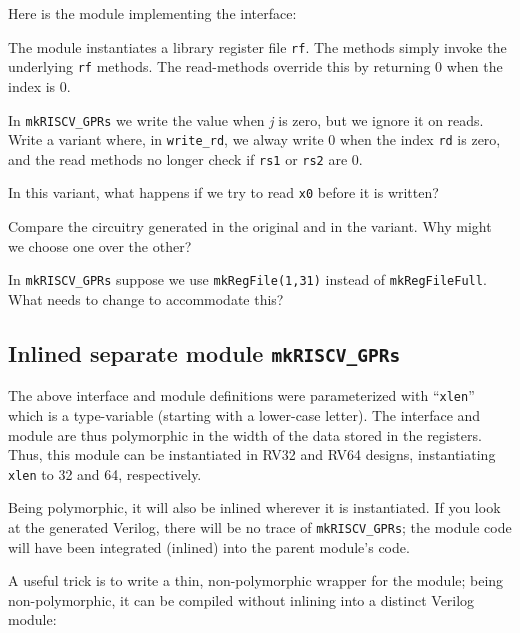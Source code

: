 


Here is the module implementing the interface:



The module instantiates a library register file {\tt rf}.  The methods
simply invoke the underlying {\tt rf} methods.  The read-methods
override this by returning 0 when the index is 0.

\hdivider

\Exercise
\hm In {\tt mkRISCV\_GPRs} we write the value when \emph{j} is zero,
but we ignore it on reads.  Write a variant where, in {\tt write\_rd},
we alway write 0 when the index {\tt rd} is zero, and the read methods
no longer check if {\tt rs1} or {\tt rs2} are 0.

In this variant, what happens if we try to read {\tt x0} before it is
written?

Compare the circuitry generated in the original and in the variant.
Why might we choose one over the other?

\Exercise
\hm In {\tt mkRISCV\_GPRs} suppose we use {\tt mkRegFile(1,31)} instead of
{\tt mkRegFileFull}.  What needs to change to accommodate this?

\Endexercise


\subsection{Inlined {\vs} separate module {\tt mkRISCV\_GPRs}}

The above interface and module definitions were parameterized with
``\verb|xlen|'' which is a type-variable (starting with a lower-case
letter).  The interface and module are thus polymorphic in the width
of the data stored in the registers.  Thus, this module can be
instantiated in RV32 and RV64 designs, instantiating \verb|xlen| to 32
and 64, respectively.

Being polymorphic, it will also be inlined wherever it is
instantiated.  If you look at the generated Verilog, there will be no
trace of \verb|mkRISCV_GPRs|; the module code will have been
integrated (inlined) into the parent module's code.

A useful trick is to write a thin, non-polymorphic wrapper for the
module; being non-polymorphic, it can be compiled without inlining
into a distinct Verilog module:

